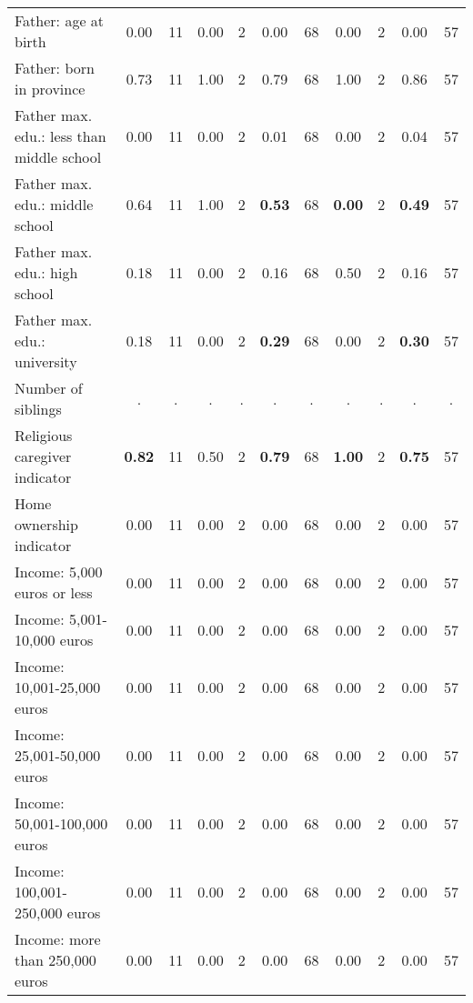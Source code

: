 \begin{tabular}{l c c c c c c c c c c}
Father: age at birth &      0.00 &        11 &      0.00 &         2 &      0.00 &        68 &      0.00 &         2 &      0.00 &        57 \\
Father: born in province &      0.73 &        11 &      1.00 &         2 &      0.79 &        68 &      1.00 &         2 &      0.86 &        57 \\
Father max. edu.: less than middle school &      0.00 &        11 &      0.00 &         2 &      0.01 &        68 &      0.00 &         2 &      0.04 &        57 \\
Father max. edu.: middle school &      0.64 &        11 &      1.00 &         2 & \textbf{     0.53} &        68 & \textbf{     0.00} &         2 & \textbf{     0.49} &        57 \\
Father max. edu.: high school &      0.18 &        11 &      0.00 &         2 &      0.16 &        68 &      0.50 &         2 &      0.16 &        57 \\
Father max. edu.: university &      0.18 &        11 &      0.00 &         2 & \textbf{     0.29} &        68 &      0.00 &         2 & \textbf{     0.30} &        57 \\
Number of siblings &         . & . &         . & . &         . & . &         . & . &         . & . \\
Religious caregiver indicator & \textbf{     0.82} &        11 &      0.50 &         2 & \textbf{     0.79} &        68 & \textbf{     1.00} &         2 & \textbf{     0.75} &        57 \\
Home ownership indicator &      0.00 &        11 &      0.00 &         2 &      0.00 &        68 &      0.00 &         2 &      0.00 &        57 \\
Income: 5,000 euros or less &      0.00 &        11 &      0.00 &         2 &      0.00 &        68 &      0.00 &         2 &      0.00 &        57 \\
Income: 5,001-10,000 euros &      0.00 &        11 &      0.00 &         2 &      0.00 &        68 &      0.00 &         2 &      0.00 &        57 \\
Income: 10,001-25,000 euros &      0.00 &        11 &      0.00 &         2 &      0.00 &        68 &      0.00 &         2 &      0.00 &        57 \\
Income: 25,001-50,000 euros &      0.00 &        11 &      0.00 &         2 &      0.00 &        68 &      0.00 &         2 &      0.00 &        57 \\
Income: 50,001-100,000 euros &      0.00 &        11 &      0.00 &         2 &      0.00 &        68 &      0.00 &         2 &      0.00 &        57 \\
Income: 100,001-250,000 euros &      0.00 &        11 &      0.00 &         2 &      0.00 &        68 &      0.00 &         2 &      0.00 &        57 \\
Income: more than 250,000 euros &      0.00 &        11 &      0.00 &         2 &      0.00 &        68 &      0.00 &         2 &      0.00 &        57 \\
\bottomrule
\end{tabular}
